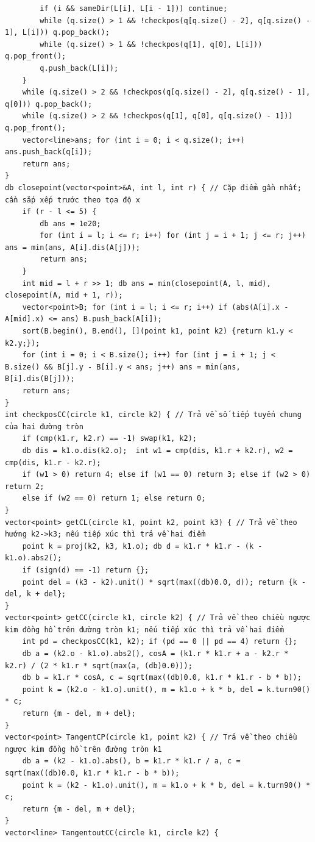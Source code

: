 \documentclass[11pt]{article}
\begin{document}
\begin{verbatim}
		if (i && sameDir(L[i], L[i - 1])) continue;
		while (q.size() > 1 && !checkpos(q[q.size() - 2], q[q.size() - 1], L[i])) q.pop_back();
		while (q.size() > 1 && !checkpos(q[1], q[0], L[i])) q.pop_front();
		q.push_back(L[i]);
	}
	while (q.size() > 2 && !checkpos(q[q.size() - 2], q[q.size() - 1], q[0])) q.pop_back();
	while (q.size() > 2 && !checkpos(q[1], q[0], q[q.size() - 1])) q.pop_front();
	vector<line>ans; for (int i = 0; i < q.size(); i++) ans.push_back(q[i]);
	return ans;
}
db closepoint(vector<point>&A, int l, int r) { // Cặp điểm gần nhất; cần sắp xếp trước theo tọa độ x
	if (r - l <= 5) {
		db ans = 1e20;
		for (int i = l; i <= r; i++) for (int j = i + 1; j <= r; j++) ans = min(ans, A[i].dis(A[j]));
		return ans;
	}
	int mid = l + r >> 1; db ans = min(closepoint(A, l, mid), closepoint(A, mid + 1, r));
	vector<point>B; for (int i = l; i <= r; i++) if (abs(A[i].x - A[mid].x) <= ans) B.push_back(A[i]);
	sort(B.begin(), B.end(), [](point k1, point k2) {return k1.y < k2.y;});
	for (int i = 0; i < B.size(); i++) for (int j = i + 1; j < B.size() && B[j].y - B[i].y < ans; j++) ans = min(ans, B[i].dis(B[j]));
	return ans;
}
int checkposCC(circle k1, circle k2) { // Trả về số tiếp tuyến chung của hai đường tròn
	if (cmp(k1.r, k2.r) == -1) swap(k1, k2);
	db dis = k1.o.dis(k2.o);  int w1 = cmp(dis, k1.r + k2.r), w2 = cmp(dis, k1.r - k2.r);
	if (w1 > 0) return 4; else if (w1 == 0) return 3; else if (w2 > 0) return 2;
	else if (w2 == 0) return 1; else return 0;
}
vector<point> getCL(circle k1, point k2, point k3) { // Trả về theo hướng k2->k3; nếu tiếp xúc thì trả về hai điểm
	point k = proj(k2, k3, k1.o); db d = k1.r * k1.r - (k - k1.o).abs2();
	if (sign(d) == -1) return {};
	point del = (k3 - k2).unit() * sqrt(max((db)0.0, d)); return {k - del, k + del};
}
vector<point> getCC(circle k1, circle k2) { // Trả về theo chiều ngược kim đồng hồ trên đường tròn k1; nếu tiếp xúc thì trả về hai điểm
	int pd = checkposCC(k1, k2); if (pd == 0 || pd == 4) return {};
	db a = (k2.o - k1.o).abs2(), cosA = (k1.r * k1.r + a - k2.r * k2.r) / (2 * k1.r * sqrt(max(a, (db)0.0)));
	db b = k1.r * cosA, c = sqrt(max((db)0.0, k1.r * k1.r - b * b));
	point k = (k2.o - k1.o).unit(), m = k1.o + k * b, del = k.turn90() * c;
	return {m - del, m + del};
}
vector<point> TangentCP(circle k1, point k2) { // Trả về theo chiều ngược kim đồng hồ trên đường tròn k1
	db a = (k2 - k1.o).abs(), b = k1.r * k1.r / a, c = sqrt(max((db)0.0, k1.r * k1.r - b * b));
	point k = (k2 - k1.o).unit(), m = k1.o + k * b, del = k.turn90() * c;
	return {m - del, m + del};
}
vector<line> TangentoutCC(circle k1, circle k2) {

\end{verbatim}
\end{document}
